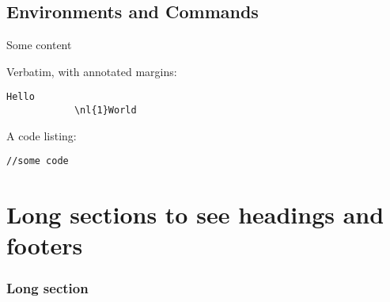 \documentclass[a4paper,12pt,fleqn,twoside,openright,style=phpro]{yapbook}
\begin{document}
        \chapter{Environments and Commands}


            \begin{Exercise*}[title={This is an Exercise},difficulty=1]

            \ExePart

            Some content

            \end{Exercise*}

            Verbatim, with annotated margins:

            \begin{Verbatim}[commandchars=\\\{\}]
            Hello
            \nl{1}World
            \end{Verbatim}

            A code listing:

            \begin{lstlisting}[caption={This is the title}]
            //some code
            \end{lstlisting}


    \part{Long sections to see headings and footers}

        \section{Long section}

        \lipsum
        \lipsum
        \lipsum





\appendix

\backmatter



%
%
\end{document}

